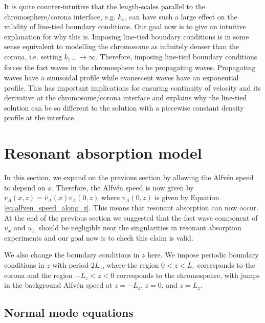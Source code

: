 \documentclass[linenumbers]{aastex63}
\begin{document}
It is quite counter-intuitive that the length-scales parallel to the chromosphere/corona interface, e.g. $k_x$, can have such a large effect on the validity of line-tied boundary conditions. Our goal now is to give an intuitive explanation for why this is. Imposing line-tied boundary conditions is in some sense equivalent to modelling the chromosome as infinitely denser than the corona, i.e. setting $k_{||-}\rightarrow \infty$. Therefore, imposing line-tied boundary conditions forces the fast waves in the chromosphere to be propagating waves. Propagating waves have a sinusoidal profile while evanescent waves have an exponential profile. This has important implications for ensuring continuity of velocity and its derivative at the chromosome/corona interface and explains why the line-tied solution can be so different to the solution with a piecewise constant density profile at the interface.

\section{Resonant absorption model}
\label{sec:resonant_absorption_model}

In this section, we expand on the previous section by allowing the Alfv\'en speed to depend on $x$. Therefore, the Alfv\'en speed is now given by $v_A(x,z)=\hat{v}_A(x)v_A(0,z)$ where $v_A(0,z)$ is given by Equation \eqref{eq:alfven_speed_along_z}. This means that resonant absorption can now occur. At the end of the previous section we suggested that the fast wave component of $u_x$ and $u_\perp$ should be negligible near the singularities in resonant absorption experiments and our goal now is to check this claim is valid.

We also change the boundary conditions in $z$ here. We impose periodic boundary conditions in $z$ with period $2L_z$, where the region $0 < z < L_z$ corresponds to the corona and the region $-L_z < z < 0$ corresponds to the chromospehre, with jumps in the background Alfv\'en speed at $z=-L_z$, $z=0$, and $z=L_z$.

\subsection{Normal mode equations}
\end{document}
